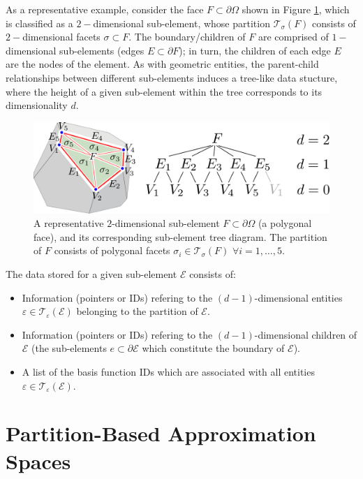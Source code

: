 	As a representative example, consider the face $F \subset \partial \Omega$ shown in Figure \ref{fig:sub_element}, which is classified as a $2-$dimensional sub-element, whose partition $\mathcal{T}_\sigma (F)$ consists of $2-$dimensional facets $\sigma \subset F$. The boundary/children of $F$ are comprised of $1-$dimensional sub-elements (edges $E \subset \partial F$); in turn, the children of each edge $E$ are the nodes of the element. As with geometric entities, the parent-child relationships between different sub-elements induces a tree-like data stucture, where the height of a given sub-element within the tree corresponds to its dimensionality $d$.
	\begin{figure} [!ht]
		\centering
		\includegraphics[width = 6.0in]{figures/sub_element.pdf}
		\caption{A representative $2$-dimensional sub-element $F \subset \partial \Omega$ (a polygonal face), and its corresponding sub-element tree diagram. The partition of $F$ consists of polygonal facets $\sigma_i \in \mathcal{T}_{\sigma} (F) \, \, \forall i = 1, \ldots, 5$.}
		\label{fig:sub_element}
	\end{figure}
	
	The data stored for a given sub-element $\mathcal{E}$ consists of:
	\begin{itemize}
		\item Information (pointers or IDs) refering to the $(d-1)$-dimensional entities $\varepsilon \in \mathcal{T}_\varepsilon (\mathcal{E})$ belonging to the partition of $\mathcal{E}$.
		\item Information (pointers or IDs) refering to the $(d-1)$-dimensional children of $\mathcal{E}$ (the sub-elements $e \subset \partial \mathcal{E}$ which constitute the boundary of $\mathcal{E}$).
		\item A list of the basis function IDs which are associated with all entities $\varepsilon \in \mathcal{T}_\varepsilon (\mathcal{E})$.
	\end{itemize}
	
\section{Partition-Based Approximation Spaces}

